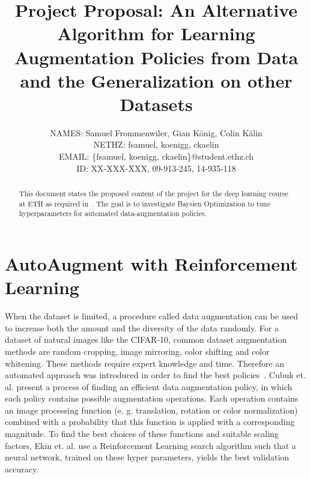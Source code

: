 \documentclass[10pt,twocolumn,letterpaper]{article}
\begin{document}
\title{Project Proposal: An Alternative Algorithm for Learning Augmentation Policies from Data and the Generalization on other Datasets}

\author{
    	\small{NAMES: Samuel Frommenwiler, Gian K\"onig, Colin K\"alin} \\
   	\small{NETHZ: fsamuel, koenigg, ckaelin}\\
	\small{EMAIL: \{fsamuel, koenigg, ckaelin\}$@$student.ethz.ch}\\
    	\small{ID: XX-XXX-XXX, 09-913-245, 14-935-118}
}

\maketitle

\begin{abstract}
   This document states the proposed content of the project for the deep learning course at ETH as required in~\cite{DL18}. The goal is to investigate Baysien Optimization to tune hyperparameters for automated data-augmentation policies.
\end{abstract}

\section{AutoAugment with Reinforcement Learning}
When the dataset is limited, a procedure called data augmentation can be used to increase both the amount and the diversity of the data randomly. For a dataset of natural images like the CIFAR-10, common dataset augmentation methods are random cropping, image mirroring, color shifting and color whitening. These methods require expert knowledge and time. Therefore an automated approach was introduced in order to find the best policies~\cite{Ekin}. Cubuk et. al. present a process of finding an efficient data augmentation policy, in which each policy contains possible augmentation operations. Each operation contains an image processing function (e. g. translation, rotation or color normalization) combined with a probability that this function is applied with a corresponding magnitude. To find the best choices of these functions and suitable scaling factors, Ekin et. al. use a Reinforcement Learning search algorithm such that a neural network, trained on these hyper parameters, yields the best validation accuracy.
\end{document}
